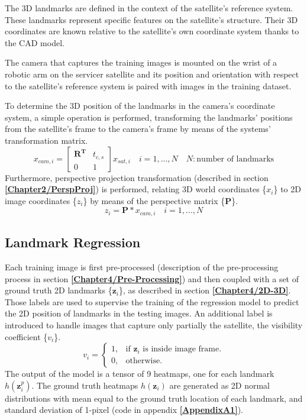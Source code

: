 The 3D landmarks are defined in the context of the satellite's reference system. These landmarks represent specific features on the satellite's structure. Their 3D coordinates are known relative to the satellite's own coordinate system thanks to the CAD model.

The camera that captures the training images is mounted on the wrist of a robotic arm on the servicer satellite and its position and orientation with respect to the satellite's reference system is paired with images in the training dataset.

To determine the 3D position of the landmarks in the camera's coordinate system, a simple operation is performed, transforming the landmarks' positions from the satellite's frame to the camera's frame by means of the systems' transformation matrix.
\begin{equation}
    x_{cam,i} = 
\begin{bmatrix}
    \textbf{R}^\textbf{T} & t_{c,s}\\
    0 & 1
\end{bmatrix}
x_{sat,i} \quad i = 1,...,N \quad N:\textrm{number of landmarks}
\end{equation}
Furthermore, perspective projection transformation (described in section \textbf{\ref{Chapter2/PerspProj}}) is performed, relating 3D world coordinates \{\(x_{i}\)\} to 2D image coordinates \{\(z_{i}\)\} by means of the perspective matrix \{\(\textbf{P}\)\}.
\begin{equation}
    z_{i} = \textbf{P}*x_{cam,i} \quad i = 1,...,N
\end{equation}

\newpage
\subsection{Landmark Regression}
\label{Chapter4/LandReg}
Each training image is first pre-processed (description of the pre-processing process in section \textbf{\ref{Chapter4/Pre-Processing}}) and then coupled with a set of ground truth 2D landmarks \{\(\textbf{z}_{i}\)\}, as described in section \textbf{\ref{Chapter4/2D-3D}}. Those labels are used to supervise the training of the regression model to predict the 2D position of landmarks in the testing images. An additional label is introduced to handle images that capture only partially the satellite, the visibility coefficient \{\(v_{i}\)\}.
\begin{equation}
  v_{i}=\begin{cases}
    1, & \text{if $\textbf{z}_{i}$ is inside image frame}.\\
    0, & \text{otherwise}.
  \end{cases}
\end{equation}
The output of the model is a tensor of 9 heatmaps, one for each landmark $h(\textbf{z}_{i}^p)$. The ground truth heatmaps $h(\textbf{z}_{i})$ are generated as 2D normal distributions with mean equal to the ground truth location of each landmark, and standard deviation of 1-pixel (code in appendix \textbf{\ref{AppendixA1}}).

